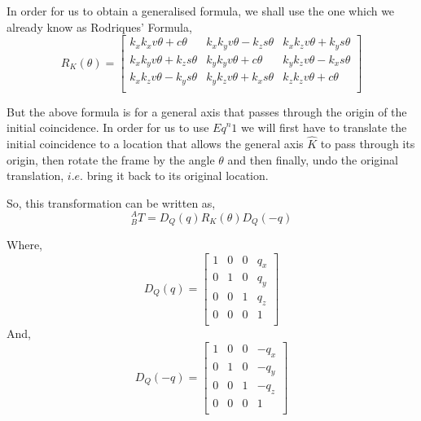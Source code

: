 \documentclass[a4paper]{article}
\begin{document}
\begin{qalist}
			In order for us to obtain a generalised formula, we shall use the one which we already know as Rodriques' Formula, 
			\begin{equation}
			{R}_{K}(\theta) = 
				\left[ \begin{matrix} 
					\textit{${k}_{x}{k}_{x}v\theta + c\theta$} & \textit{${k}_{x}{k}_{y}v\theta - {k}_{z}s\theta$} & \textit{${k}_{x}{k}_{z}v\theta + {k}_{y}s\theta$} \\
					\textit{${k}_{x}{k}_{y}v\theta + {k}_{z}s\theta$} & \textit{${k}_{y}{k}_{y}v\theta + c\theta$} & \textit{${k}_{y}{k}_{z}v\theta - {k}_{x}s\theta$} \\
					\textit{${k}_{x}{k}_{z}v\theta - {k}_{y}s\theta$} & \textit{${k}_{y}{k}_{z}v\theta + {k}_{x}s\theta$} & \textit{${k}_{z}{k}_{z}v\theta + c\theta$} \\
				\end{matrix} \right]
			\end{equation}
			
			But the above formula is for a general axis that passes through the origin of the initial coincidence.
			In order for us to use ${Eq}^{n} 1$ we will first have to translate the initial coincidence to a location that allows the general axis $\hat{K}$ to pass through its origin, then rotate the frame by the angle $\theta$ and then finally, undo the original translation, $i.e.$ bring it back to its original location.
			
			So, this transformation can be written as,
			\begin{equation}
				{}^{A}_{B}{T} = {D}_{Q}(q) {R}_{K}(\theta) {D}_{Q}(-q)
			\end{equation}
			
			Where, 
			\begin{equation}
				{D}_{Q}(q) = 
				\begin{bmatrix}
					1 & 0 & 0 & {q}_{x} \\
					0 & 1 & 0 & {q}_{y} \\
					0 & 0 & 1 & {q}_{z} \\
					0 & 0 & 0 & 1 \\
				\end{bmatrix}
			\end{equation}
			And, 
			\begin{equation}
				{D}_{Q}(-q) = 
				\left[ \begin{matrix}
					1 & 0 & 0 & -{q}_{x} \\
					0 & 1 & 0 & -{q}_{y} \\
					0 & 0 & 1 & -{q}_{z} \\
					0 & 0 & 0 & 1 \\
				\end{matrix}\right]
			\end{equation}
			

\end{qalist}
\end{document}
